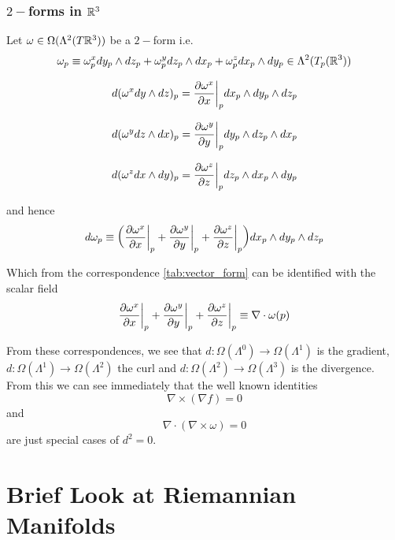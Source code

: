 \subsubsection{$2-$forms in $\mathbb{R}^3$}
Let $\omega \in \Omega(\Lambda^2(T\mathbb{R}^3))$ be a $2-$form i.e. $$ \omega_p\equiv \omega^x_p dy_p \wedge dz_p + \omega^y_p dz_p \wedge dx_p + \omega^z_p dx_p \wedge dy_p \in \Lambda^2(T_p(\mathbb{R}^3))$$

$$d(\omega^x dy\wedge dz)_p=\frac{\partial \omega^x}{\partial x}\bigg{|}_p dx_p \wedge dy_p \wedge dz_p $$

$$d(\omega^y dz\wedge dx)_p=\frac{\partial \omega^y}{\partial y}\bigg{|}_p dy_p \wedge dz_p \wedge dx_p $$

$$d(\omega^z dx\wedge dy)_p=\frac{\partial \omega^z}{\partial z}\bigg{|}_p dz_p \wedge dx_p \wedge dy_p $$

and hence $$d \omega_p \equiv \bigg{(}\frac{\partial \omega^x}{\partial x} \bigg{|}_p +\frac{\partial \omega^y}{\partial y} \bigg{|}_p +\frac{\partial \omega^z}{\partial z} \bigg{|}_p  \bigg{)}dx_p \wedge dy_p \wedge dz_p$$

Which from the correspondence \ref{tab:vector_form} can be identified with the scalar field $$\frac{\partial \omega^x}{\partial x} \bigg{|}_p+\frac{\partial \omega^y}{\partial y} \bigg{|}_p+\frac{\partial \omega^z}{\partial z} \bigg{|}_p \equiv \nabla \cdot \omega(p) $$

From these correspondences, we see that $d:\Omega(\Lambda^0)\to \Omega(\Lambda^1)$ is the gradient, $d:\Omega(\Lambda^1)\to \Omega(\Lambda^2)$ the curl and $d:\Omega(\Lambda^2)\to \Omega(\Lambda^3)$ is the divergence. From this we can see immediately that the well known identities $$\nabla \times (\nabla f)=0 $$ and $$\nabla \cdot (\nabla \times \omega)=0 $$ are just special cases of $d^2=0$. 




\section{Brief Look at Riemannian Manifolds}\label{app:riemannian}

